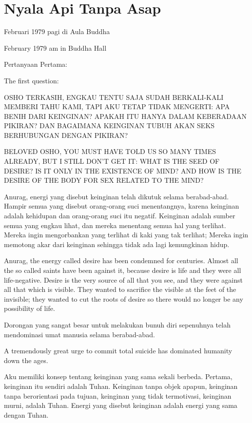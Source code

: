 \chapter{Nyala Api Tanpa Asap} %

 Februari 1979 pagi di Aula Buddha

 February 1979 am in Buddha Hall

\bahasa
Pertanyaan Pertama:

\english
The first question:

\bahasa
OSHO TERKASIH,
ENGKAU TENTU SAJA SUDAH BERKALI-KALI MEMBERI TAHU KAMI, TAPI AKU TETAP TIDAK MENGERTI: APA BENIH DARI KEINGINAN? APAKAH ITU HANYA DALAM KEBERADAAN PIKIRAN? DAN BAGAIMANA KEINGINAN TUBUH AKAN SEKS BERHUBUNGAN DENGAN PIKIRAN?


\english
BELOVED OSHO,
YOU MUST HAVE TOLD US SO MANY TIMES ALREADY, BUT I STILL DON'T GET IT: WHAT IS THE SEED OF DESIRE? IS IT ONLY IN THE EXISTENCE OF MIND? AND HOW IS THE DESIRE OF THE BODY FOR SEX RELATED TO THE MIND?

\bahasa
Anurag, energi yang disebut keinginan telah dikutuk selama berabad-abad. Hampir semua yang disebut orang-orang suci menentangnya, karena keinginan adalah kehidupan dan orang-orang suci itu negatif. Keinginan adalah sumber semua yang engkau lihat, dan mereka menentang semua hal yang terlihat. Mereka ingin mengorbankan yang terlihat di kaki yang tak terlihat; Mereka ingin memotong akar dari keinginan sehingga tidak ada lagi kemungkinan hidup.

\english
Anurag, the energy called desire has been condemned for centuries. Almost all the so called saints have been against it, because desire is life and they were all life-negative. Desire is the very source of all that you see, and they were against all that which is visible. They wanted to sacrifice the visible at the feet of the invisible; they wanted to cut the roots of desire so there would no longer be any possibility of life.

\bahasa
Dorongan yang sangat besar untuk melakukan bunuh diri sepenuhnya telah mendominasi umat manusia selama berabad-abad.

\english
A tremendously great urge to commit total suicide has dominated humanity down the ages.

\bahasa
Aku memiliki konsep tentang keinginan yang sama sekali berbeda. Pertama, keinginan itu sendiri adalah Tuhan. Keinginan tanpa objek apapun, keinginan tanpa berorientasi pada tujuan, keinginan yang tidak termotivasi, keinginan murni, adalah Tuhan. Energi yang disebut keinginan adalah energi yang sama dengan Tuhan.

